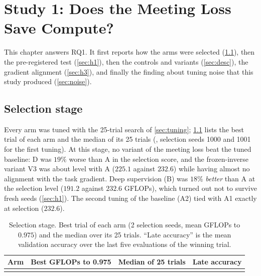 \chapter{Study 1: Does the Meeting Loss Save Compute?}\label{ch:study1}

This chapter answers RQ1. It first reports how the arms were selected (\cref{sec:selection}), then the pre-registered test (\cref{sec:h1}), then the controls and variants (\cref{sec:desc}), the gradient alignment (\cref{sec:h3}), and finally the finding about tuning noise that this study produced (\cref{sec:noise}).

\section{Selection stage}\label{sec:selection}
Every arm was tuned with the 25-trial search of \cref{sec:tuning}; \cref{tab:selection} lists the best trial of each arm and the median of its 25 trials (\tierE{}, selection seeds 1000 and 1001 for the first tuning). At this stage, no variant of the meeting loss beat the tuned baseline: D was $19\%$ worse than A in the selection score, and the frozen-inverse variant V3 was about level with A ($225.1$ against $232.6$) while having almost no alignment with the task gradient. Deep supervision (B) was $18\%$ \emph{better} than A at the selection level ($191.2$ against $232.6$ GFLOPs), which turned out not to survive fresh seeds (\cref{sec:h1}). The second tuning of the baseline (A2) tied with A1 exactly at selection ($232.6$).

\begin{table}[t]
\centering\small
\caption{Selection stage. Best trial of each arm (2 selection seeds, mean GFLOPs to $0.975$) and the median over its 25 trials. ``Late accuracy'' is the mean validation accuracy over the last five evaluations of the winning trial.}
\label{tab:selection}
\begin{tabular}{@{}l r r r@{}}
\toprule
Arm & Best GFLOPs to 0.975 & Median of 25 trials & Late accuracy\\
\midrule
\\
\bottomrule
\end{tabular}
\end{table}

